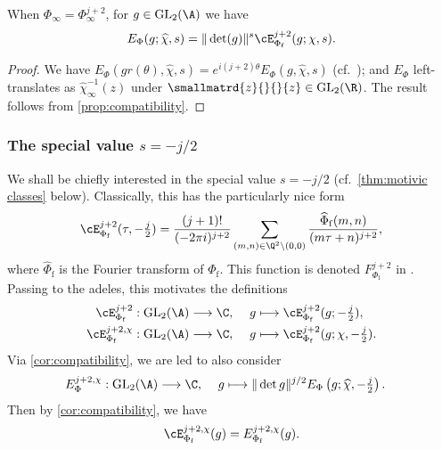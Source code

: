 \documentclass[10pt,reqno,a4paper]{amsart}
\newcommand{\Phif}{{\Phi\subf}}
\newcommand{\chihat}{\widehat{\chi}}
\newcommand{\subf}{_{\mathrm{f}}}
\newcommand{\GL}{\mathrm{GL}}
\begin{document}
\begin{corollary}\label{cor:compatibility}
When $\Phi_\infty = \Phi_\infty^{j+2}$, for $g \in \GL_2(\A)$ we have
\[
E_\Phi(g; \chihat, s) = \|\det(g)\|^s \cE_{\Phif}^{j+2}(g;\chi, s).
\]
\end{corollary}

\begin{proof}
We have $E_\Phi(g  r(\theta), \chihat, s) = e^{i(j+2)\theta}E_{\Phi}(g,\chihat, s)$ (cf.\ \cite[\S3,(7.35)]{Bump}); and $E_{\Phi}$ left-translates as $\chihat^{-1}_\infty(z)$ under $\smallmatrd{z}{}{}{z} \in \GL_2(\R)$. The result follows from \cref{prop:compatibility}.
\end{proof}





\subsubsection{The special value $s = -j/2$}\label{sec:special value j/2}
We shall be chiefly interested in the special value $s = -j/2$ (cf.\ \cref{thm:motivic classes} below). Classically, this has the particularly nice form
\[
\cE^{j+2}_\Phif(\tau,-\tfrac{j}{2}) = \frac{(j+1)!}{(-2\pi i)^{j+2}}\sum_{(m,n) \in \Q^2 \backslash (0,0)} \frac{\widehat{\Phi}\subf(m,n)}{(m\tau + n)^{j+2}},
\]
where $\widehat{\Phi}\subf$ is the Fourier transform of $\Phi\subf$. This function is denoted $F^{j+2}_{\Phif}$ in \cite{LSZ17}. Passing to the adeles, this motivates the definitions
\begin{align}
\cE_{\Phif}^{j+2} : \GL_2(\A) &\longrightarrow \C, \hspace{12pt} g \longmapsto \cE_{\Phif}^{j+2}(g; -\tfrac{j}{2}),\notag \\
\cE_{\Phif}^{j+2,\chi} : \GL_2(\A) &\longrightarrow \C, \hspace{12pt} g \longmapsto \cE_{\Phif}^{j+2}(g;\chi, -\tfrac{j}{2}). \label{eq:classical E j chi}
\end{align}
Via \cref{cor:compatibility}, we are led to also consider
\begin{align}
\label{eq:E j chi}  E_{\Phi}^{j+2,\chi} : \GL_2(\A) &\longrightarrow \C, \hspace{12pt} g \longmapsto \|\det g\|^{j/2} E_\Phi\left(g;\chihat, -\tfrac{j}{2}\right).
\end{align}
Then by \cref{cor:compatibility}, we have
\begin{equation}\label{eq:compatibility}
\cE_{\Phif}^{j+2,\chi}(g) = E_{\Phif}^{j+2,\chi}(g).
\end{equation}
\end{document}
